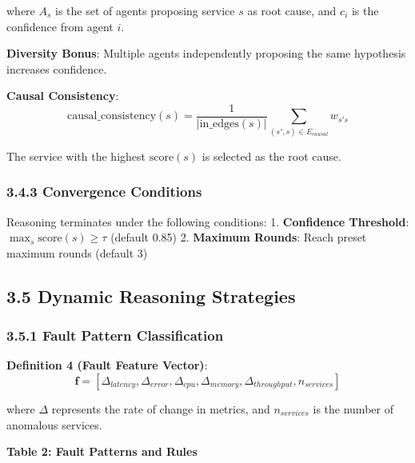 where \(A_s\) is the set of agents proposing service \(s\) as root
cause, and \(c_i\) is the confidence from agent \(i\).

\textbf{Diversity Bonus}: Multiple agents independently proposing the
same hypothesis increases confidence.

\textbf{Causal Consistency}:
\[\text{causal\_consistency}(s) = \frac{1}{|\text{in\_edges}(s)|} \sum_{(s', s) \in E_{causal}} w_{s's}\]

The service with the highest \(\text{score}(s)\) is selected as the root
cause.

\hypertarget{convergence-conditions}{%
\subsubsection{3.4.3 Convergence
Conditions}\label{convergence-conditions}}

Reasoning terminates under the following conditions: 1.
\textbf{Confidence Threshold}: \(\max_s \text{score}(s) \geq \tau\)
(default 0.85) 2. \textbf{Maximum Rounds}: Reach preset maximum rounds
(default 3)

\hypertarget{dynamic-reasoning-strategies}{%
\subsection{3.5 Dynamic Reasoning
Strategies}\label{dynamic-reasoning-strategies}}

\hypertarget{fault-pattern-classification}{%
\subsubsection{3.5.1 Fault Pattern
Classification}\label{fault-pattern-classification}}

\textbf{Definition 4 (Fault Feature Vector)}:
\[\mathbf{f} = [\Delta_{latency}, \Delta_{error}, \Delta_{cpu}, \Delta_{memory}, \Delta_{throughput}, n_{services}]\]

where \(\Delta\) represents the rate of change in metrics, and
\(n_{services}\) is the number of anomalous services.

\textbf{Table 2: Fault Patterns and Rules}

